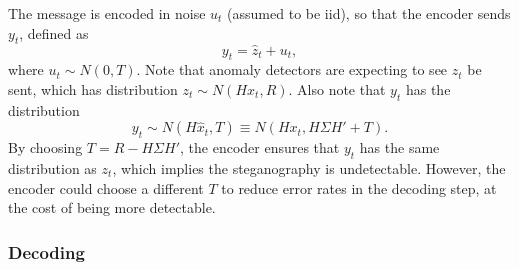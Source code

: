 \documentclass{article}
\begin{document}
The message is encoded in noise $u_t$ (assumed to be iid), so that the encoder sends $y_t$, defined as
\begin{equation}
	\label{eq:encoder-obs-est}
	y_t = \hat{z}_t + u_t,
\end{equation}
where $u_t\sim N(0, T)$. Note that anomaly detectors are expecting to see $z_t$ be sent, which has distribution $z_t\sim N(H x_t, R)$. Also note that $y_t$ has the distribution
\begin{equation}
	y_t \sim N(H \hat{x}_t, T) \equiv N(H x_t, H \Sigma H' + T).
\end{equation}
By choosing $T = R - H \Sigma H'$, the encoder ensures that $y_t$ has the same distribution as $z_t$, which implies the steganography is undetectable. However, the encoder could choose a different $T$ to reduce error rates in the decoding step, at the cost of being more detectable.

\subsubsection{Decoding}
\end{document}
